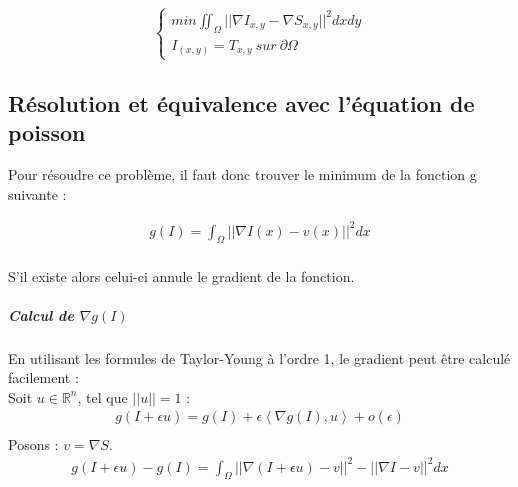 \begin{center}
\begin{equation}
\left\{
\begin{aligned}
 min \iint_\Omega || \nabla I_{x,y} - \nabla S_{x,y}||^2 dxdy\\
 I_{(x,y)} = T_{x,y} \ sur\ \partial \Omega
\end{aligned}
\right.
\end{equation}
\end{center}


\subsection{Résolution et équivalence avec l'équation de poisson}
Pour résoudre ce problème, il faut donc trouver le minimum de la fonction g suivante  : 
\begin{center}
\begin{equation}
\begin{aligned}
g(I) = \int_\Omega || \nabla I(x) - v(x)||^2 dx\\
\end{aligned}
\end{equation}
\end{center}
S'il existe alors celui-ci annule le gradient de la fonction. 
\subparagraph{Calcul de $\nabla g(I)$ }
En utilisant les formules de Taylor-Young à l'ordre 1, le gradient peut être calculé facilement :\\
Soit $u \in \mathbb{R}^n$, tel que $||u||=1$ :
\begin{equation*}
\begin{aligned}
g(I+\epsilon u) = g(I) +\epsilon \left<\nabla g(I), u\right> + o(\epsilon)\\
\end{aligned}
\end{equation*}
Posons : $v = \nabla S$.
\begin{equation*} 
\begin{aligned}
    g(I+\epsilon u) -g(I) =  \int_\Omega || \nabla (I+\epsilon u) - v||^2 - ||\nabla I -v ||^2 dx\\
\end{aligned}
\end{equation*} 
